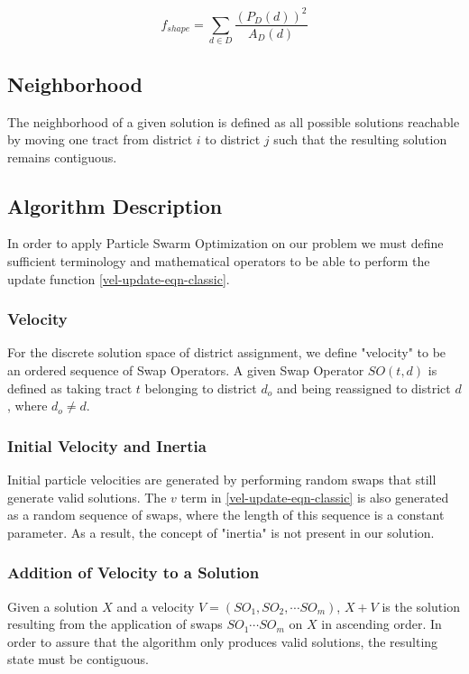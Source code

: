 \documentclass[journal]{IEEEtran}
\begin{document}
$$f_{shape} = \sum_{d \in D} \frac{(P_D(d))^2}{A_D(d)}$$

\subsection{Neighborhood}
The neighborhood of a given solution is defined as all possible solutions
reachable by moving one tract from district $i$ to district $j$ such that the
resulting solution remains contiguous.


\subsection{Algorithm Description}
In order to apply Particle Swarm Optimization on our problem we must define
sufficient terminology and mathematical operators to be able to perform the
update function \ref{vel-update-eqn-classic}.\\

\subsubsection{Velocity}
For the discrete solution space of district assignment, we define "velocity" to
be an ordered sequence of Swap Operators.  A given Swap Operator $SO(t, d)$ is
defined as taking tract $t$ belonging to district $d_o$ and being reassigned to
district $d$, where $d_o \neq d$.\\

\subsubsection{Initial Velocity and Inertia}
Initial particle velocities are generated by performing random swaps that still
generate valid solutions.  The $v$ term in \ref{vel-update-eqn-classic} is also
generated as a random sequence of swaps, where the length of this sequence is a
constant parameter.  As a result, the concept of "inertia" is not present in our
solution.\\

\subsubsection{Addition of Velocity to a Solution}
Given a solution $X$ and a velocity $V = (SO_1, SO_2, \cdots SO_m)$, $X + V$ is
the solution resulting from the application of swaps $SO_1 \cdots SO_m$ on $X$
in ascending order.  In order to assure that the algorithm only produces valid
solutions, the resulting state must be contiguous.\\
\end{document}
